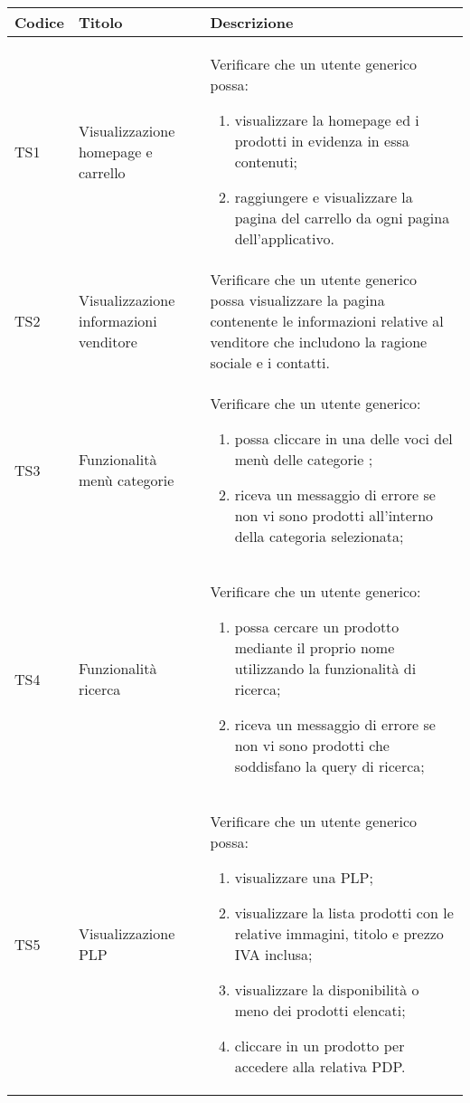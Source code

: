 \begin{center}
	\begin{longtable}{p{1cm}|p{6.85cm}|p{7cm}|}
	\hline
	\rowcolor{lighter-grayer}
	\textbf{Codice} & \textbf{Titolo} & \textbf{Descrizione} \\
	\hline
	\endfirsthead



	\hline
	TS1 & Visualizzazione homepage e carrello & Verificare che un utente generico possa: \begin{enumerate}
		\item  visualizzare la homepage ed i prodotti in evidenza in essa contenuti;
		\item  raggiungere e visualizzare la pagina del carrello da ogni pagina dell'applicativo.
	\end{enumerate} \\

	TS2 & Visualizzazione informazioni venditore & Verificare che un utente generico possa visualizzare la pagina contenente le informazioni relative al venditore che includono la ragione sociale e i contatti. \\

	TS3 & Funzionalità menù categorie & Verificare che un utente generico: \begin{enumerate}
		\item  possa cliccare in una delle voci del menù delle categorie ;
		\item  riceva un messaggio di errore se non vi sono prodotti all'interno della categoria selezionata;
	\end{enumerate} \\

	TS4 & Funzionalità ricerca & Verificare che un utente generico: \begin{enumerate}
		\item  possa cercare un prodotto mediante il proprio nome utilizzando la funzionalità di ricerca;
		\item  riceva un messaggio di errore se non vi sono prodotti che soddisfano la query di ricerca;
	\end{enumerate} \\


	TS5 & Visualizzazione PLP & Verificare che un utente generico possa: \begin{enumerate}
		\item  visualizzare una PLP;
		\item  visualizzare la lista prodotti con le relative immagini, titolo e prezzo IVA inclusa;
		\item  visualizzare la disponibilità o meno dei prodotti elencati;
		\item  cliccare in un prodotto per accedere alla relativa PDP.
	\end{enumerate} \\


\end{longtable}
\end{center}

